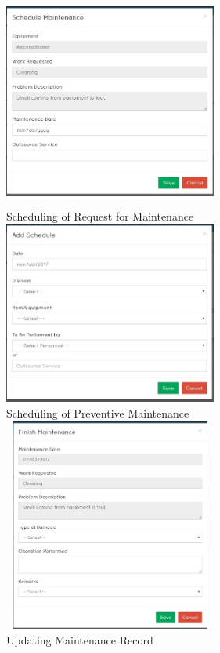 \begin{center}
\begin{center}
	\includegraphics[width=7cm,height=7cm]{image/d3-13.jpg}\\
	Scheduling of Request for Maintenance\\
	\vspace{1cm}
	\includegraphics[width=7cm,height=6cm]{image/d3-14.jpg}\\
	Scheduling of Preventive Maintenance\\
	\vspace{1cm}
	\includegraphics[width=7cm,height=7cm]{image/d3-15.jpg}\\
	Updating Maintenance Record\\
\end{center}


\end{center}
